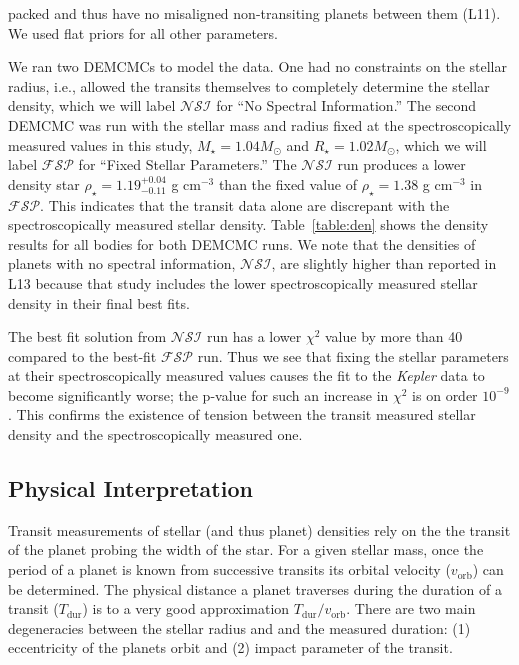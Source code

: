 \documentclass[twocolumn,trackchanges]{aastex61}
\newcommand{\Kepler}{\textit{Kepler} }
\begin{document}
packed and thus have no misaligned non-transiting planets between them (L11). We used flat priors for all other parameters.

We ran two DEMCMCs to model the data. One had no constraints on the stellar radius, i.e., allowed the transits themselves to completely determine the stellar density, which we will label $\mathcal{NSI}$ for ``No Spectral Information.'' The second DEMCMC was run with the stellar mass and radius fixed at the spectroscopically measured values in this study, $M_\star=1.04M_\odot$ and $R_\star=1.02M_\odot$, which we will label $\mathcal{FSP}$ for ``Fixed Stellar Parameters.'' The $\mathcal{NSI}$ run produces a lower density star $\rho_\star = 1.19^{+0.04}_{-0.11}$ g cm$^{-3}$ than the fixed value of $\rho_\star = 1.38$ g cm$^{-3}$ in $\mathcal{FSP}$. This indicates that the transit data alone are discrepant with the spectroscopically measured stellar density. Table~\ref{table:den} shows the  density results for all bodies for both DEMCMC runs. We note that the densities of planets with no spectral information, $\mathcal{NSI}$, are slightly higher than reported in L13 because that study includes the lower spectroscopically measured stellar density in their final best fits.

The best fit solution from $\mathcal{NSI}$ run has a lower $\chi^2$ value by more than 40 compared to the best-fit $\mathcal{FSP}$ run. Thus we see that fixing the stellar parameters at their spectroscopically measured values causes the fit to the \Kepler data to become significantly worse; the p-value for such an increase in $\chi^2$ is on order $10^{-9}$. This confirms the existence of tension between the transit measured stellar density and the spectroscopically measured one. 

\vspace{8mm}

\subsection{Physical Interpretation}

Transit measurements of stellar (and thus planet) densities rely on the the transit of the planet probing the width of the star. For a given stellar mass, once the period of a planet is known from successive transits its orbital velocity ($v_\mathrm{orb}$) can be determined. The physical distance a planet traverses during the duration of a transit ($T_\mathrm{dur}$) is to a very good approximation $T_\mathrm{dur} / v_\mathrm{orb}$. There are two main degeneracies between the stellar radius and and the measured duration: (1) eccentricity of the planets orbit and (2) impact parameter of the transit. 
\end{document}
